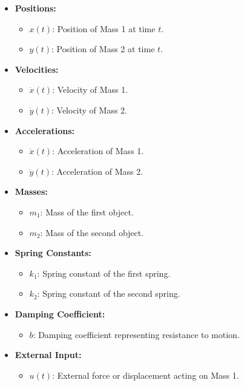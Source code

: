\documentclass{article}
\begin{document}
\begin{itemize}
    \item \textbf{Positions:}
    \begin{itemize}
        \item \( x(t) \): Position of Mass 1 at time \( t \).
        \item \( y(t) \): Position of Mass 2 at time \( t \).
    \end{itemize}
    \item \textbf{Velocities:}
    \begin{itemize}
        \item \( \dot{x}(t) \): Velocity of Mass 1.
        \item \( \dot{y}(t) \): Velocity of Mass 2.
    \end{itemize}
    \item \textbf{Accelerations:}
    \begin{itemize}
        \item \( \ddot{x}(t) \): Acceleration of Mass 1.
        \item \( \ddot{y}(t) \): Acceleration of Mass 2.
    \end{itemize}
    \item \textbf{Masses:}
    \begin{itemize}
        \item \( m_1 \): Mass of the first object.
        \item \( m_2 \): Mass of the second object.
    \end{itemize}
    \item \textbf{Spring Constants:}
    \begin{itemize}
        \item \( k_1 \): Spring constant of the first spring.
        \item \( k_2 \): Spring constant of the second spring.
    \end{itemize}
    \item \textbf{Damping Coefficient:}
    \begin{itemize}
        \item \( b \): Damping coefficient representing resistance to motion.
    \end{itemize}
    \item \textbf{External Input:}
    \begin{itemize}
        \item \( u(t) \): External force or displacement acting on Mass 1.
    \end{itemize}
\end{itemize}
\end{document}
